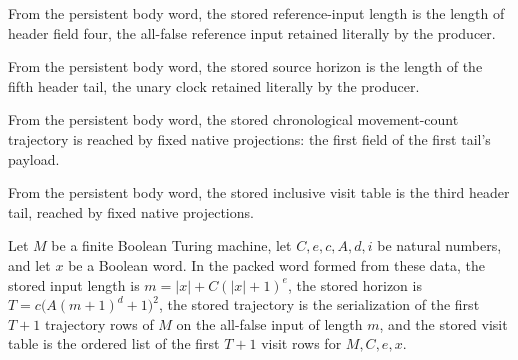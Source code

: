 \begin{definition}
\label{Complexity.clA5InputSize}
\leanok
{}
From the persistent body word, the stored reference-input length is the length of header field four, the all-false reference input retained literally by the producer.
\end{definition}

\begin{definition}
\label{Complexity.clA5Horizon}
\leanok
{}
From the persistent body word, the stored source horizon is the length of the fifth header tail, the unary clock retained literally by the producer.
\end{definition}

\begin{definition}
\label{Complexity.clA5Trajectory}
\leanok
{}
From the persistent body word, the stored chronological movement-count trajectory is reached by fixed native projections: the first field of the first tail's payload.
\end{definition}

\begin{definition}
\label{Complexity.clA5Visits}
\leanok
{}
From the persistent body word, the stored inclusive visit table is the third header tail, reached by fixed native projections.
\end{definition}

\begin{lemma}
\label{Complexity.clA5Data_exact}
\leanok
{}
Let $M$ be a finite Boolean Turing machine, let $C,e,c,A,d,i$ be natural numbers, and
let $x$ be a Boolean word. In the packed word formed from these data, the stored input
length is $m=|x|+C(|x|+1)^e$, the stored horizon is $T=c\bigl(A(m+1)^d+1\bigr)^2$, the
stored trajectory is the serialization of the first $T+1$ trajectory rows of $M$ on the
all-false input of length $m$, and the stored visit table is the ordered list of the
first $T+1$ visit rows for $M,C,e,x$.
\end{lemma}

